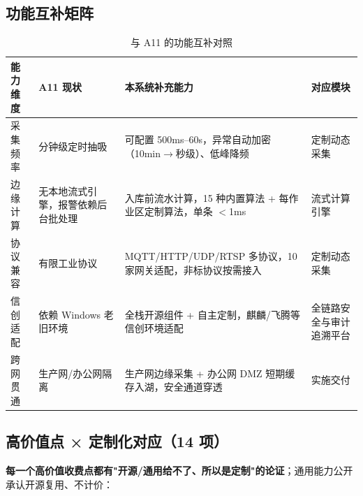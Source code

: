 \documentclass[11pt,a4paper]{ctexart}
\begin{document}
\subsection{功能互补矩阵}

\begin{table}[H]\centering
\caption{与 A11 的功能互补对照}
\begin{tabular}{p{2.6cm} p{4.2cm} p{4.2cm} p{2.6cm}}
\toprule
\textbf{能力维度} & \textbf{A11 现状} & \textbf{本系统补充能力} & \textbf{对应模块} \\
\midrule
采集频率 & 分钟级定时抽吸 & 可配置 500ms--60s，异常自动加密（10min$\rightarrow$秒级）、低峰降频 & 定制动态采集 \\
边缘计算 & 无本地流式引擎，报警依赖后台批处理 & 入库前流水计算，15 种内置算法 + 每作业区定制算法，单条 $<$1ms & 流式计算引擎 \\
协议兼容 & 有限工业协议 & MQTT/\allowbreak{}HTTP/\allowbreak{}UDP/\allowbreak{}RTSP 多协议，10 家网关适配，非标协议按需接入 & 定制动态采集 \\
信创适配 & 依赖 Windows 老旧环境 & 全栈开源组件 + 自主定制，麒麟/飞腾等信创环境适配 & 全链路安全与审计追溯平台 \\
跨网贯通 & 生产网/办公网隔离 & 生产网边缘采集 + 办公网 DMZ 短期缓存入湖，安全通道穿透 & 实施交付 \\
\bottomrule
\end{tabular}
\end{table}

\subsection{高价值点 × 定制化对应（14 项）}

\textbf{每一个高价值收费点都有"开源/通用给不了、所以是定制"的论证}；通用能力公开承认开源复用、不计价：
\end{document}
